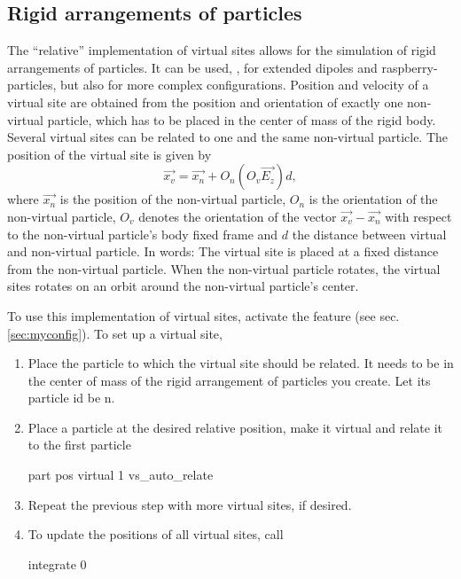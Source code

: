 \subsection{Rigid arrangements of particles}

The ``relative'' implementation of virtual sites allows for the
simulation of rigid arrangements of particles. It can be used, \eg,
for extended dipoles and raspberry-particles, but also for more
complex configurations.  Position and velocity of a virtual site are
obtained from the position and orientation of exactly one non-virtual
particle, which has to be placed in the center of mass of the rigid
body. Several virtual sites can be related to one and the same
non-virtual particle.  The position of the virtual site is given by
\begin{equation}
\vec{x_v} =\vec{x_n} +O_n (O_v \vec{E_z}) d,
\end{equation}
where $\vec{x_n}$ is the position of the non-virtual particle, $O_n$
is the orientation of the non-virtual particle, $O_v$ denotes the
orientation of the vector $\vec{x_v}-\vec{x_n}$ with respect to the
non-virtual particle's body fixed frame and $d$ the distance between
virtual and non-virtual particle.  In words: The virtual site is
placed at a fixed distance from the non-virtual particle. When the
non-virtual particle rotates, the virtual sites rotates on an orbit
around the non-virtual particle's center.

To use this implementation of virtual sites, activate the feature
 (see sec. \ref{sec:myconfig}).  To
set up a virtual site,
\begin{enumerate}
\item Place the particle to which the virtual site should be
  related. It needs to be in the center of mass of the rigid
  arrangement of particles you create. Let its particle id be n.
\item Place a particle at the desired relative position, make it
  virtual and relate it to the first particle
  \begin{essyntaxbox}
    part  pos  virtual 1 vs_auto_relate 
  \end{essyntaxbox}
\item Repeat the previous step with more virtual sites, if desired.
\item To update the positions of all virtual sites, call
  \begin{essyntaxbox}
    integrate 0
  \end{essyntaxbox}
\end{enumerate}

